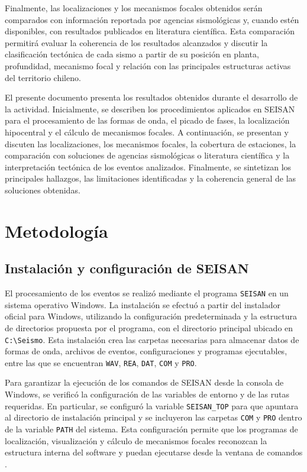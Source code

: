 \documentclass[a4paper,12pt]{article} %
\numberwithin{equation}{section} %
\numberwithin{figure}{section} %
\begin{document}
Finalmente, las localizaciones y los mecanismos focales obtenidos serán comparados con información reportada por agencias sismológicas y, cuando estén disponibles, con resultados publicados en literatura científica. Esta comparación permitirá evaluar la coherencia de los resultados alcanzados y discutir la clasificación tectónica de cada sismo a partir de su posición en planta, profundidad, mecanismo focal y relación con las principales estructuras activas del territorio chileno.

El presente documento presenta los resultados obtenidos durante el desarrollo de la actividad. Inicialmente, se describen los procedimientos aplicados en SEISAN para el procesamiento de las formas de onda, el picado de fases, la localización hipocentral y el cálculo de mecanismos focales. A continuación, se presentan y discuten las localizaciones, los mecanismos focales, la cobertura de estaciones, la comparación con soluciones de agencias sismológicas o literatura científica y la interpretación tectónica de los eventos analizados. Finalmente, se sintetizan los principales hallazgos, las limitaciones identificadas y la coherencia general de las soluciones obtenidas.

\newpage

\section{Metodología}

\subsection{Instalación y configuración de SEISAN}

El procesamiento de los eventos se realizó mediante el programa \texttt{SEISAN} en un sistema operativo Windows. La instalación se efectuó a partir del instalador oficial para Windows, utilizando la configuración predeterminada y la estructura de directorios propuesta por el programa, con el directorio principal ubicado en \texttt{C:\textbackslash Seismo}. Esta instalación crea las carpetas necesarias para almacenar datos de formas de onda, archivos de eventos, configuraciones y programas ejecutables, entre las que se encuentran \texttt{WAV}, \texttt{REA}, \texttt{DAT}, \texttt{COM} y \texttt{PRO}.

Para garantizar la ejecución de los comandos de SEISAN desde la consola de Windows, se verificó la configuración de las variables de entorno y de las rutas requeridas. En particular, se configuró la variable \texttt{SEISAN\_TOP} para que apuntara al directorio de instalación principal y se incluyeron las carpetas \texttt{COM} y \texttt{PRO} dentro de la variable \texttt{PATH} del sistema. Esta configuración permite que los programas de localización, visualización y cálculo de mecanismos focales reconozcan la estructura interna del software y puedan ejecutarse desde la ventana de comandos \cite{seisan_windows_manual}.
\end{document}
